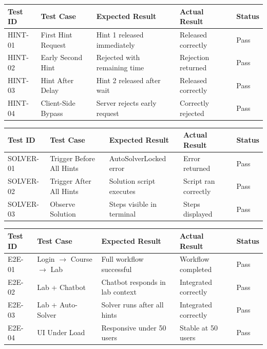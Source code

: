 \documentclass[12pt,a4paper]{report}
\newcommand{\hrow}{}
\newcommand{\hcell}[1]{\textbf{#1}}
\newcommand{\altrow}{}
\begin{document}
\begin{center}
\begin{tabular}{|L{1.8cm}|L{3cm}|L{3.2cm}|L{3.2cm}|L{2cm}|}
\hline
\hrow \hcell{Test ID} & \hcell{Test Case} & \hcell{Expected Result} & \hcell{Actual Result} & \hcell{Status} \\
\hline
HINT-01 & First Hint Request & Hint 1 released immediately & Released correctly & Pass \\\hline
\altrow HINT-02 & Early Second Hint & Rejected with remaining time & Rejection returned & Pass \\\hline
HINT-03 & Hint After Delay & Hint 2 released after wait & Released correctly & Pass \\\hline
\altrow HINT-04 & Client-Side Bypass & Server rejects early request & Correctly rejected & Pass \\\hline
\end{tabular}
\label{tab:hint-test}
\end{center}

\vspace{8pt}

\begin{center}
\begin{tabular}{|L{1.8cm}|L{3cm}|L{3.2cm}|L{3.2cm}|L{2cm}|}
\hline
\hrow \hcell{Test ID} & \hcell{Test Case} & \hcell{Expected Result} & \hcell{Actual Result} & \hcell{Status} \\
\hline
SOLVER-01 & Trigger Before All Hints & AutoSolverLocked error & Error returned & Pass \\\hline
\altrow SOLVER-02 & Trigger After All Hints & Solution script executes & Script ran correctly & Pass \\\hline
SOLVER-03 & Observe Solution & Steps visible in terminal & Steps displayed & Pass \\\hline
\end{tabular}
\label{tab:solver-test}
\end{center}

\vspace{8pt}

\begin{center}
\begin{tabular}{|L{1.8cm}|L{3cm}|L{3.2cm}|L{3.2cm}|L{2cm}|}
\hline
\hrow \hcell{Test ID} & \hcell{Test Case} & \hcell{Expected Result} & \hcell{Actual Result} & \hcell{Status} \\
\hline
E2E-01 & Login $\to$ Course $\to$ Lab & Full workflow successful & Workflow completed & Pass \\\hline
\altrow E2E-02 & Lab + Chatbot & Chatbot responds in lab context & Integrated correctly & Pass \\\hline
E2E-03 & Lab + Auto-Solver & Solver runs after all hints & Integrated correctly & Pass \\\hline
\altrow E2E-04 & UI Under Load & Responsive under 50 users & Stable at 50 users & Pass \\\hline
\end{tabular}
\label{tab:e2e-test}
\end{center}
\end{document}
